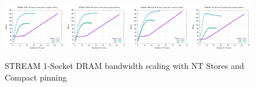 \documentclass{article}
\begin{document}
\begin{figure}[!ht]
    \centering
    \includegraphics[width=0.24\textwidth]{../mem_bw_scale/mb_scale_compact_Copy_nt}
    \includegraphics[width=0.24\textwidth]{../mem_bw_scale/mb_scale_compact_Triad_nt}
    \includegraphics[width=0.24\textwidth]{../mem_bw_scale/mb_scale_compact_Reduce_nt}
    \includegraphics[width=0.24\textwidth]{../mem_bw_scale/mb_scale_compact_Fill_nt}
    \caption{STREAM 1-Socket DRAM bandwidth scaling with NT Stores and Compact pinning}
    \label{figure:mem_bw_scale_compact_nt}
\end{figure}
\end{document}
